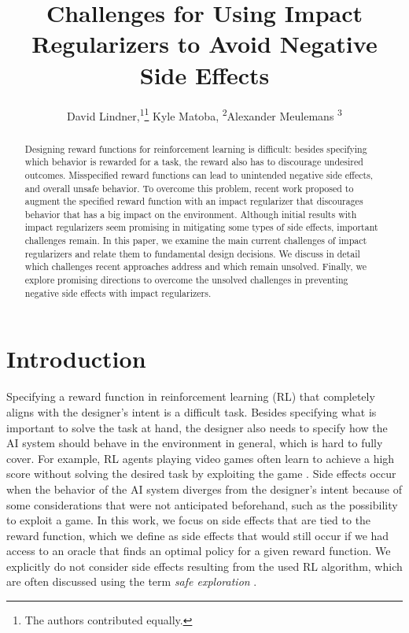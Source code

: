 \documentclass[letterpaper]{article} %
\title{Challenges for Using Impact Regularizers to Avoid Negative Side Effects}
\author {
    David Lindner,\textsuperscript{\rm 1}\thanks{The authors contributed equally.}
    Kyle Matoba, \textsuperscript{\rm 2}\footnotemark[1]
    Alexander Meulemans \textsuperscript{\rm 3}\footnotemark[1] \\
}
\begin{document}
\maketitle
\begin{abstract}
Designing reward functions for reinforcement learning is difficult: besides specifying which behavior is rewarded for a task, the reward also has to discourage undesired outcomes. Misspecified reward functions can lead to unintended negative side effects, and overall unsafe behavior. To overcome this problem, recent work proposed to augment the specified reward function with an impact regularizer that discourages behavior that has a big impact on the environment.
Although initial results with impact regularizers seem promising in mitigating some types of side effects, important challenges remain. In this paper, we examine the main current challenges of impact regularizers and relate them to fundamental design decisions. We discuss in detail which challenges recent approaches address and which remain unsolved. Finally, we explore promising directions to overcome the unsolved challenges in preventing negative side effects with impact regularizers.

\end{abstract}

\section{Introduction}
\label{sec:introduction}
Specifying a reward function in reinforcement learning (RL) that completely aligns with the designer's intent is a difficult task. Besides specifying what is important to solve the task at hand, the designer also needs to specify how the AI system should behave in the environment in general, which is hard to fully cover. For example, RL agents playing video games often learn to achieve a high score without solving the desired task by exploiting the game \citep[e.g.][]{Saunders2017}.
Side effects occur when the behavior of the AI system diverges from the designer's intent because of some considerations that were not anticipated beforehand, such as the possibility to exploit a game. In this work, we focus on side effects that are tied to the reward function, which we define as side effects that would still occur if we had access to an oracle that finds an optimal policy for a given reward function. We explicitly do not consider side effects resulting from the used RL algorithm, which are often discussed using the term \emph{safe exploration} \citep{garcia2015comprehensive}. 
\end{document}
